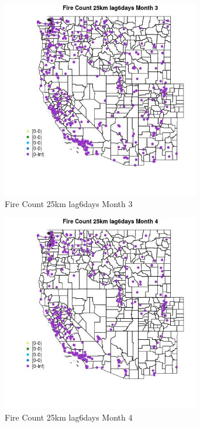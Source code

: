 \begin{figure} 
\centering  
\includegraphics[width=0.77\textwidth]{Code_Outputs/Report_ML_input_PM25_Step4_part_e_de_duplicated_aves_compiled_2019-05-18wNAs_MapObsMo3Fire_Count_25km_lag6days.jpg} 
\caption{\label{fig:Report_ML_input_PM25_Step4_part_e_de_duplicated_aves_compiled_2019-05-18wNAsMapObsMo3Fire_Count_25km_lag6days}Fire Count 25km lag6days Month 3} 
\end{figure} 
 

\begin{figure} 
\centering  
\includegraphics[width=0.77\textwidth]{Code_Outputs/Report_ML_input_PM25_Step4_part_e_de_duplicated_aves_compiled_2019-05-18wNAs_MapObsMo4Fire_Count_25km_lag6days.jpg} 
\caption{\label{fig:Report_ML_input_PM25_Step4_part_e_de_duplicated_aves_compiled_2019-05-18wNAsMapObsMo4Fire_Count_25km_lag6days}Fire Count 25km lag6days Month 4} 
\end{figure} 
 

